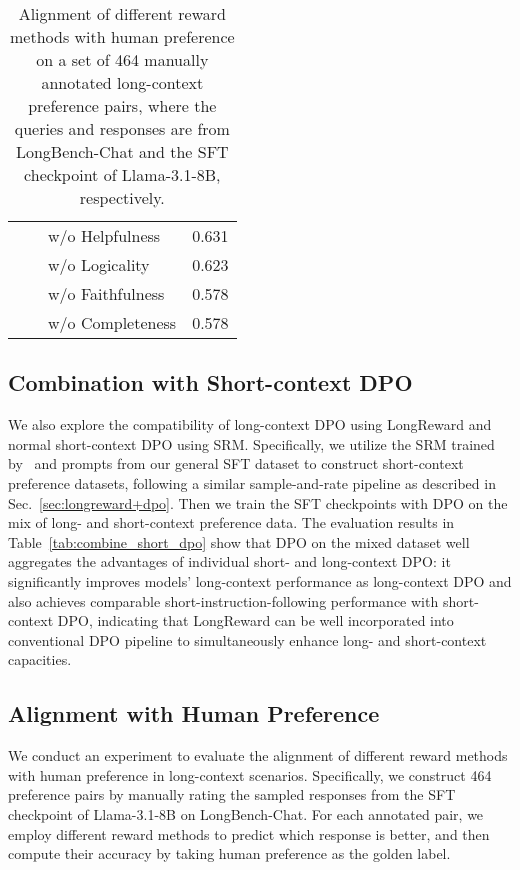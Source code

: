\begin{table}[t]
{\begin{tabular}{lc}
\ \ \ \ w/o Helpfulness  & 0.631 \\
\ \ \ \ w/o Logicality   & 0.623 \\
\ \ \ \ w/o Faithfulness & 0.578 \\
\ \ \ \ w/o Completeness & 0.578 \\ \bottomrule
\end{tabular}
}
\caption{Alignment of different reward methods with human preference on a set of 464 manually annotated long-context preference pairs, where the queries and responses are from LongBench-Chat and the SFT checkpoint of Llama-3.1-8B, respectively. }
\label{tab:reward_model}
\end{table}\subsection{Combination with Short-context DPO}
We also explore the compatibility of long-context DPO using LongReward and normal short-context DPO using SRM. Specifically, we utilize the SRM trained by~\citet{chatglm-rlhf} and prompts from our general SFT dataset to construct short-context preference datasets, following a similar sample-and-rate pipeline as described in Sec.~\ref{sec:longreward+dpo}. Then we train the SFT checkpoints with DPO on the mix of long- and short-context preference data. The evaluation results in Table~\ref{tab:combine_short_dpo} show that DPO on the mixed dataset well aggregates the advantages of individual short- and long-context DPO: it significantly improves models' long-context performance as long-context DPO and also achieves comparable short-instruction-following performance with short-context DPO, indicating that LongReward can be well incorporated into conventional DPO pipeline to simultaneously enhance long- and short-context capacities.

\subsection{Alignment with Human Preference}
\label{sec:human_agreement}
We conduct an experiment to evaluate the alignment of different reward methods with human preference in long-context scenarios. Specifically, we construct 464 preference pairs by manually rating the sampled responses from the SFT checkpoint of Llama-3.1-8B on LongBench-Chat. For each annotated pair,  we employ different reward methods to predict which response is better, and then compute their accuracy by taking human preference as the golden label.

